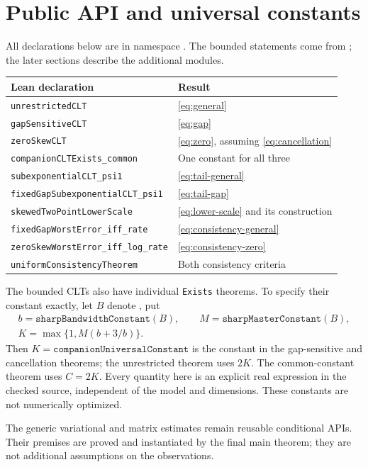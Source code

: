 \documentclass[11pt]{article}
\begin{document}
\section{Public API and universal constants}
All declarations below are in namespace .
The bounded statements come from
; the later sections describe
the additional modules.
\begin{center}
\begin{tabular}{ll}
\toprule
Lean declaration & Result\\
\midrule
\texttt{unrestrictedCLT} & \eqref{eq:general}\\
\texttt{gapSensitiveCLT} & \eqref{eq:gap}\\
\texttt{zeroSkewCLT} & \eqref{eq:zero}, assuming \eqref{eq:cancellation}\\
\texttt{companionCLTExists\_common} & One constant for all three\\
\texttt{subexponentialCLT\_psi1} & \eqref{eq:tail-general}\\
\texttt{fixedGapSubexponentialCLT\_psi1} & \eqref{eq:tail-gap}\\
\texttt{skewedTwoPointLowerScale} & \eqref{eq:lower-scale} and its construction\\
\texttt{fixedGapWorstError\_iff\_rate} & \eqref{eq:consistency-general}\\
\texttt{zeroSkewWorstError\_iff\_log\_rate} & \eqref{eq:consistency-zero}\\
\texttt{uniformConsistencyTheorem} & Both consistency criteria\\
\bottomrule
\end{tabular}
\end{center}
The bounded CLTs also have individual \texttt{Exists} theorems. To
specify their constant exactly, let $B$ denote
, put
\begin{gather*}
 b=\texttt{sharpBandwidthConstant}(B),\qquad
 M=\texttt{sharpMasterConstant}(B),\\
 K=\max\{1,M(b+3/b)\}.
\end{gather*}
Then $K=\texttt{companionUniversalConstant}$ is the constant in the
gap-sensitive and cancellation theorems; the unrestricted theorem uses
$2K$. The common-constant theorem uses $C=2K$. Every quantity here is
an explicit real expression in the checked source, independent of the
model and dimensions. These constants are not numerically optimized.

The generic variational and matrix estimates remain reusable conditional
APIs. Their premises are proved and instantiated by the final main
theorem; they are not additional assumptions on the observations.
\end{document}
